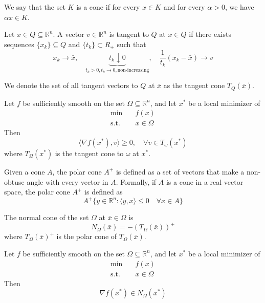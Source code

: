 \begin{definition}[Cone]
    We say that the set $K$ is a cone if for every $x \in K$ and for every $\alpha > 0$, we have $\alpha x \in K$.
\end{definition}
\begin{definition}
    Let $\bar x \in Q \subseteq \mathbb R^n$. A vector $v \in \mathbb R^n$ is tangent to $Q$ at $\bar x \in Q$ if there exists sequences $\{x_k\}\subseteq Q$ and $\{t_k\} \subset R_+$ such that $$x_k \to \bar x, \quad \underbrace{t_k \downarrow 0}_{t_k > 0, t_k \to 0, \text{non-increasing}}, \quad \frac{1}{t_k}(x_k - \bar x) \to v$$
\end{definition}
\begin{definition}
    We denote the set of all tangent vectors to $Q$ at $\bar x$ as the tangent cone $T_Q(\bar x)$.
\end{definition}
\begin{theorem}
    Let $f$ be sufficiently smooth on the set $\Omega \subseteq \mathbb R^n$, and let $x^*$ be a local minimizer of 
    \begin{align*}
        \min \quad & f(x) \\
        \text{s.t.} \quad & x \in \Omega
    \end{align*}
    Then $$\langle \nabla f(x^*), v \rangle \geq 0, \quad \forall v \in T_\omega(x^*)$$
    where $T_\Omega(x^*)$ is the tangent cone to $\omega$ at $x^*$.
\end{theorem}
\begin{definition}
    Given a cone $A$, the polar cone $A^+$ is defined as a set of vectors that make a non-obtuse angle with every vector in $A$. Formally, if $A$ is a cone in a real vector space, the polar cone $A^+$ is defined as
    $$A^+ \{y \in \mathbb R^n: \langle y, x \rangle \leq 0 \quad \forall x \in A\}$$
\end{definition}
\begin{definition}
    The normal cone of the set $\Omega$ at $\bar x \in \Omega$ is $$N_{\Omega}(\bar x) = -(T_\Omega(\bar x))^+$$ 
    where $T_\Omega(\bar x)^+$ is the polar cone of $T_\Omega(\bar x)$.
\end{definition}
\begin{corollary}
    Let $f$ be sufficiently smooth on the set $\Omega \subseteq \mathbb R^n$, and let $x^*$ be a local minimizer of 
    \begin{align*}
        \min \quad & f(x) \\
        \text{s.t.} \quad & x \in \Omega
    \end{align*}
    Then $$\nabla f(x^*) \in N_\Omega(x^*)$$
\end{corollary}

